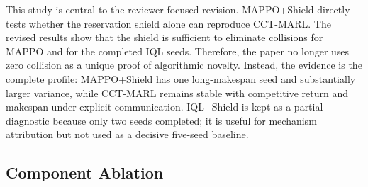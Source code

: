 \documentclass[preprint,12pt]{elsarticle}
\begin{document}
\begin{table}[htbp]
\centering
\caption{Shielded baseline and learned-coupling study. Collision is zero for shielded learning variants according to the revised runs. Shield intervention rate is retained as a measurement to log in the next run rather than fabricated here.}
\label{tab:shielded_baseline}
\end{table}


This study is central to the reviewer-focused revision. MAPPO+Shield directly tests whether the reservation shield alone can reproduce CCT-MARL. The revised results show that the shield is sufficient to eliminate collisions for MAPPO and for the completed IQL seeds. Therefore, the paper no longer uses zero collision as a unique proof of algorithmic novelty. Instead, the evidence is the complete profile: MAPPO+Shield has one long-makespan seed and substantially larger variance, while CCT-MARL remains stable with competitive return and makespan under explicit communication. IQL+Shield is kept as a partial diagnostic because only two seeds completed; it is useful for mechanism attribution but not used as a decisive five-seed baseline.

\subsection{Component Ablation}
\end{document}
